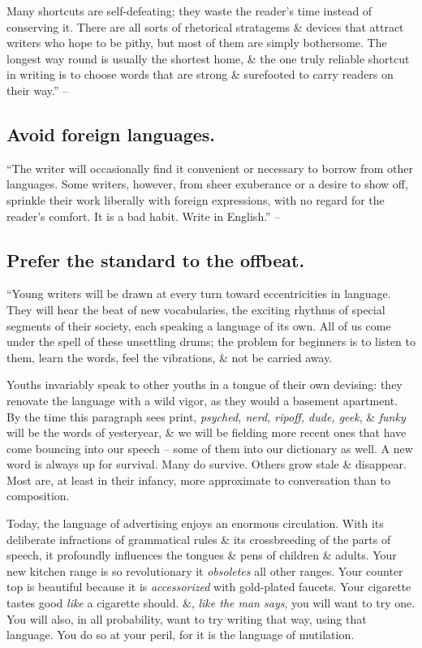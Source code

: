 \documentclass{article}
\numberwithin{equation}{section}
\begin{document}
Many shortcuts are self-defeating; they waste the reader's time instead of conserving it. There are all sorts of rhetorical stratagems \& devices that attract writers who hope to be pithy, but most of them are simply bothersome. The longest way round is usually the shortest home, \& the one truly reliable shortcut in writing is to choose words that are strong \& surefooted to carry readers on their way.'' -- \cite[p. 98]{Strunk_White2019}


\subsection{Avoid foreign languages.}
``The writer will occasionally find it convenient or necessary to borrow from other languages. Some writers, however, from sheer exuberance or a desire to show off, sprinkle their work liberally with foreign expressions, with no regard for the reader's comfort. It is a bad habit. Write in English.'' -- \cite[p. 99]{Strunk_White2019}


\subsection{Prefer the standard to the offbeat.}
``Young writers will be drawn at every turn toward eccentricities in language. They will hear the beat of new vocabularies, the exciting rhythms of special segments of their society, each speaking a language of its own. All of us come under the spell of these unsettling drums; the problem for beginners is to listen to them, learn the words, feel the vibrations, \& not be carried away.

Youths invariably speak to other youths in a tongue of their own devising: they renovate the language with a wild vigor, as they would a basement apartment. By the time this paragraph sees print, \textit{psyched, nerd, ripoff, dude, geek}, \& \textit{funky} will be the words of yesteryear, \& we will be fielding more recent ones that have come bouncing into our speech -- some of them into our dictionary as well. A new word is always up for survival. Many do survive. Others grow stale \& disappear. Most are, at least in their infancy, more approximate to conversation than to composition.

Today, the language of advertising enjoys an enormous circulation. With its deliberate infractions of grammatical rules \& its crossbreeding of the parts of speech, it profoundly influences the tongues \& pens of children \& adults. Your new kitchen range is so revolutionary it \textit{obsoletes} all other ranges. Your counter top is beautiful because it is \textit{accessorized} with gold-plated faucets. Your cigarette tastes good \textit{like} a cigarette should. \&, \textit{like the man says}, you will want to try one. You will also, in all probability, want to try writing that way, using that language. You do so at your peril, for it is the language of mutilation.
\end{document}
